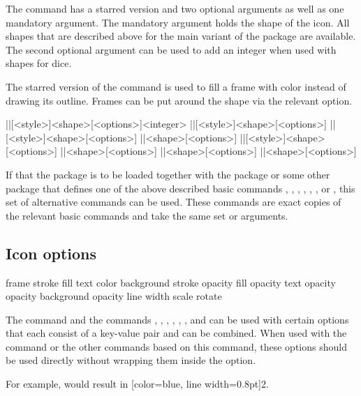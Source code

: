 \documentclass[a4paper]{article}
\begin{document}
The \macro{\DndIconsUseIcon} command has a starred version and two optional arguments as well as one mandatory argument. The mandatory argument holds the shape of the icon. All shapes that are described above for the main variant of the package are available. The second optional argument can be used to add an integer when used with shapes for dice.

The starred version of the command is used to fill a frame with color instead of drawing its outline. Frames can be put around the shape via the relevant  option. 

\begin{macrodef}
|\DndiconsDie|[<style>]{<shape>}[<options>]{<integer>}
|\DndiconsAbiliy|[<style>]{<shape>}[<options>]
|\DndiconsSaving|[<style>]{<shape>}[<options>]
|\DndiconsSpell|{<shape>}[<options>]
|\DndiconsSpellschool|[<style>]{<shape>}[<options>]
|\DndiconsDamage|{<shape>}[<options>]
|\DndiconsAttack|{<shape>}[<options>]
|\DndiconsCondition|{<shape>}[<options>]
\end{macrodef}
If that the  package is to be loaded together with the  package or some other package that defines one of the above described basic commands \macro{\die}, \macro{\ability}, \macro{\saving}, \macro{\spell}, \macro{\spellschool}, \macro{\damage}, \macro{\attack} or \macro{\condition}, this set of alternative commands can be used. These commands are exact copies of the relevant basic commands and take the same set or arguments. 

\subsection{Icon options}

\begin{macrodef}
frame
stroke
fill
text
color
background
stroke opacity 
fill opacity
text opacity
opacity 
background opacity
line width
scale
rotate
\end{macrodef}
The \macro{\DndIconsUseIcon} command and the commands \macro{\die}, \macro{\ability}, \macro{\saving}, \macro{\spell}, \macro{\spellschool}, \macro{\damage}, \macro{\attack} and \macro{\condition} can be used with certain options that each consist of a key-value pair and can be combined. When used with the \macro{\DndIconsUseIcon} command or the other commands based on this command, these options should be used directly without wrapping them inside the  option. 

For example,  would result in [color=blue, line width=0.8pt]{2}.
\end{document}
